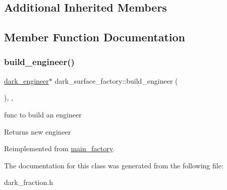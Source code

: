 \subsection*{Additional Inherited Members}


\subsection{Member Function Documentation}
\mbox{\label{classdark__surface__factory_a70172395b97a039eed8e3ff193f9f6a6}} 
\subsubsection{\texorpdfstring{build\+\_\+engineer()}{build\_engineer()}}
{\footnotesize\ttfamily \mbox{\hyperlink{classdark__engineer}{dark\+\_\+engineer}}$\ast$ dark\+\_\+surface\+\_\+factory\+::build\+\_\+engineer (\begin{DoxyParamCaption}{ }\end{DoxyParamCaption})\hspace{0.3cm}{\ttfamily [inline]}, {\ttfamily [override]}, {\ttfamily [virtual]}}

func to build an engineer \begin{DoxyReturn}{Returns}
new engineer 
\end{DoxyReturn}


Reimplemented from \mbox{\hyperlink{classmain__factory_ac970fe346638331722123f2bb240b590}{main\+\_\+factory}}.



The documentation for this class was generated from the following file\+:\begin{DoxyCompactItemize}
\item 
dark\+\_\+fraction.\+h\end{DoxyCompactItemize}
